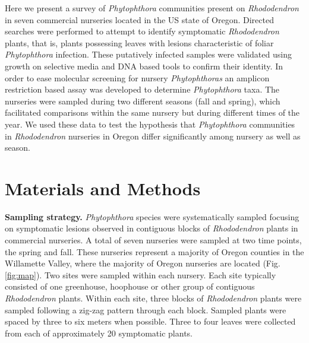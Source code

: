 \documentclass[12pt]{article}
\begin{document}
Here we present a survey of \emph{Phytophthora} communities present on \emph{Rhododendron} in seven commercial nurseries located in the US state of Oregon.  Directed searches were performed to attempt to identify symptomatic \emph{Rhododendron} plants, that is, plants possessing leaves with lesions characteristic of foliar \emph{Phytophthora} infection.  These putatively infected samples were validated using growth on selective media and DNA based tools to confirm their identity.  In order to ease molecular screening for nursery \emph{Phytophthoras} an amplicon restriction based assay was developed to determine \emph{Phytophthora} taxa.  The nurseries were sampled during two different seasons (fall and spring), which facilitated comparisons within the same nursery but during different times of the year.  We used these data to test the hypothesis that \emph{Phytophthora} communities in \emph{Rhododendron} nurseries in Oregon differ significantly among nursery as well as season.


\section*{\sffamily\normalsize{Materials and Methods}}


\textbf{Sampling strategy.} \emph{Phytophthora} species were systematically sampled focusing on symptomatic lesions observed in contiguous blocks of \emph{Rhododendron} plants in commercial nurseries.  A total of seven nurseries were sampled at two time points, the spring and fall.  These nurseries represent a majority of Oregon counties in the Willamette Valley, where the majority of Oregon nurseries are located (Fig. \ref{fig:map}).  Two sites were sampled within each nursery.  Each site typically consisted of one greenhouse, hoophouse or other group of contiguous \emph{Rhododendron} plants.  Within each site, three blocks of \emph{Rhododendron} plants were sampled following a zig-zag pattern through each block.  Sampled plants were spaced by three to six meters when possible.  Three to four leaves were collected from each of approximately 20 symptomatic plants.
\end{document}
